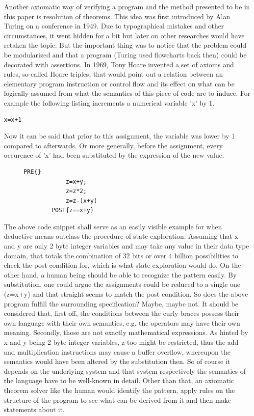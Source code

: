 Another axiomatic way of verifying a program and the method presented to be in this paper is resolution of theorems. This idea was first introduced by Alan Turing on a conference in 1949. Due to typographical mistakes and other circumstances, it went hidden for a bit but later on other researches would have retaken the topic. But the important thing was to notice that the problem could be modularized and that a program (Turing used flowcharts back then) could be decorated with assertions. In 1969, Tony Hoare invented a set of axioms and rules, so-called Hoare triples, that would point out a relation between an elementary program instruction or control flow and its effect on what can be logically assumed from what the semantics of this piece of code are to induce. For example the following listing increments a numerical variable 'x' by 1.

\begin{lstlisting}[caption={First listing}]
	x=x+1
\end{lstlisting}

Now it can be said that prior to this assignment, the variable was lower by 1 compared to afterwards. Or more generally, before the assignment, every occurence of 'x' had been substituted by the expression of the new value.

\begin{figure}
	\begin{lstlisting}[caption={Disadvantages of state-space exploration}]
		PRE{}
			z=x+y;
			z=z*2;
			z=z-(x+y)
		POST{z==x+y}
	\end{lstlisting}
\end{figure}

The above code snippet shall serve as an easily visible example for when deductive means outclass the procedure of state exploration. Assuming that x and y are only 2 byte integer variables and may take any value in their data type domain, that totals the combination of 32 bits or over 4 billion possibilities to check the post condition for, which is what state exploration would do. On the other hand, a human being should be able to recognize the pattern easily. By substitution, one could argue the assignments could be reduced to a single one (z=x+y) and that straight seems to match the post condition. So does the above program fulfill the surrounding specification? Maybe, maybe not. It should be considered that, first off, the conditions between the curly braces possess their own language with their own semantics, e.g. the operators may have their own meaning. Secondly, those are not exactly mathematical expressions. As hinted by x and y being 2 byte integer variables, z too might be restricted, thus the add and multiplication instructions may cause a buffer overflow, whereupon the semantics would have been altered by the substitution then. So of course it depends on the underlying system and that system respectively the semantics of the language have to be well-known in detail. Other than that, an axiomatic theorem solver like the human would identify the pattern, apply rules on the structure of the program to see what can be derived from it and then make statements about it.

